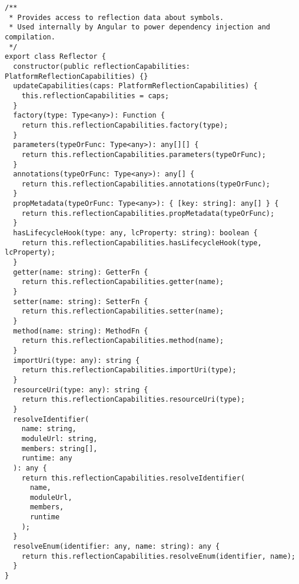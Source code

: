 \begin{verbatim}
/**
 * Provides access to reflection data about symbols.
 * Used internally by Angular to power dependency injection and compilation.
 */
export class Reflector {
  constructor(public reflectionCapabilities: PlatformReflectionCapabilities) {}
  updateCapabilities(caps: PlatformReflectionCapabilities) {
    this.reflectionCapabilities = caps;
  }
  factory(type: Type<any>): Function {
    return this.reflectionCapabilities.factory(type);
  }
  parameters(typeOrFunc: Type<any>): any[][] {
    return this.reflectionCapabilities.parameters(typeOrFunc);
  }
  annotations(typeOrFunc: Type<any>): any[] {
    return this.reflectionCapabilities.annotations(typeOrFunc);
  }
  propMetadata(typeOrFunc: Type<any>): { [key: string]: any[] } {
    return this.reflectionCapabilities.propMetadata(typeOrFunc);
  }
  hasLifecycleHook(type: any, lcProperty: string): boolean {
    return this.reflectionCapabilities.hasLifecycleHook(type, lcProperty);
  }
  getter(name: string): GetterFn {
    return this.reflectionCapabilities.getter(name);
  }
  setter(name: string): SetterFn {
    return this.reflectionCapabilities.setter(name);
  }
  method(name: string): MethodFn {
    return this.reflectionCapabilities.method(name);
  }
  importUri(type: any): string {
    return this.reflectionCapabilities.importUri(type);
  }
  resourceUri(type: any): string {
    return this.reflectionCapabilities.resourceUri(type);
  }
  resolveIdentifier(
    name: string,
    moduleUrl: string,
    members: string[],
    runtime: any
  ): any {
    return this.reflectionCapabilities.resolveIdentifier(
      name,
      moduleUrl,
      members,
      runtime
    );
  }
  resolveEnum(identifier: any, name: string): any {
    return this.reflectionCapabilities.resolveEnum(identifier, name);
  }
}
\end{verbatim}
